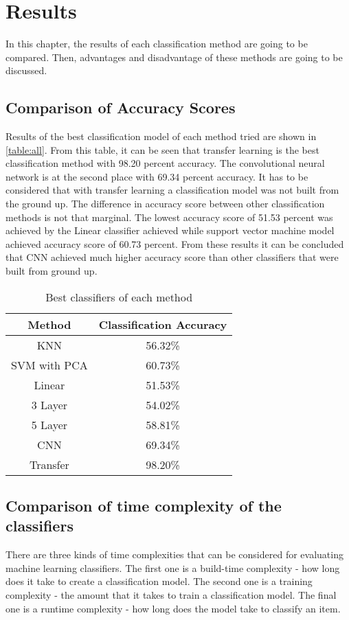 
\chapter{Results}
In this chapter, the results of each classification method are going to be compared. Then, advantages and disadvantage of these methods are going to be discussed.

\section{Comparison of Accuracy Scores}

Results of the best classification model of each method tried are shown in  \autoref{table:all}. From this table, it can be seen that transfer learning is the best classification method with 98.20 percent accuracy. The convolutional neural network is at the second place with 69.34 percent accuracy. It has to be considered that with transfer learning a classification model was not built from the ground up. The difference in accuracy score between other classification methods is not that marginal. The lowest accuracy score of 51.53 percent was achieved by the Linear classifier achieved  while support vector machine model achieved accuracy score of 60.73 percent.  From these results it can be concluded that CNN achieved much higher accuracy score than other classifiers that were built from ground up.

\begin{table}[h]
\begin{center}
\begin{tabular}{ |c|c| } 
 \hline
Method &  Classification Accuracy \\   \hline
KNN    &  56.32\% \\
SVM with PCA   & 60.73\% \\
Linear   &    51.53\%  \\
3 Layer    &   54.02\% \\
5 Layer    &  58.81\% \\
CNN & 69.34\% \\
Transfer  &  98.20\% \\

 \hline
\end{tabular}
\caption{Best classifiers of each method}
\label{table:all}
\end{center}
\end{table}


\section{Comparison  of time complexity of the classifiers}
There are three kinds of time complexities that can be considered for evaluating machine learning classifiers. The first one is a build-time complexity - how long does it take to create a classification model. The second one is a training complexity - the amount that it takes to train a classification model. The final one is a runtime complexity - how long does the model take to classify an item. 

